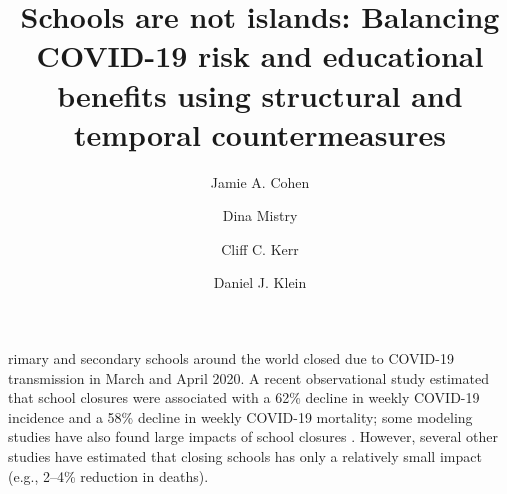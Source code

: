 \documentclass[9pt,twocolumn,twoside,lineno]{pnas-new}
\title{Schools are not islands: Balancing COVID-19 risk and educational benefits using structural and temporal countermeasures}
\author[a]{Jamie A. Cohen}
\author[a]{Dina Mistry}
\author[a]{Cliff C. Kerr}
\author[a,1]{Daniel J. Klein}
\affil[a]{Institute for Disease Modeling, Seattle, WA 98109, USA}
\begin{document}
\maketitle
\thispagestyle{firststyle}






rimary and secondary schools around the world closed due to COVID-19 transmission in March and April 2020. A recent observational study \cite{auger_association_2020} estimated that school closures were associated with a 62\% decline in weekly COVID-19 incidence and a 58\% decline in weekly COVID-19 mortality; some modeling studies have also found large impacts of school closures \cite{koo2020interventions, panovska2020determining}. However, several other studies \cite{viner_school_2020, esposito_school_2020, ng2020projected} have estimated that closing schools has only a relatively small impact (e.g., 2--4\% reduction in deaths). 
\end{document}
